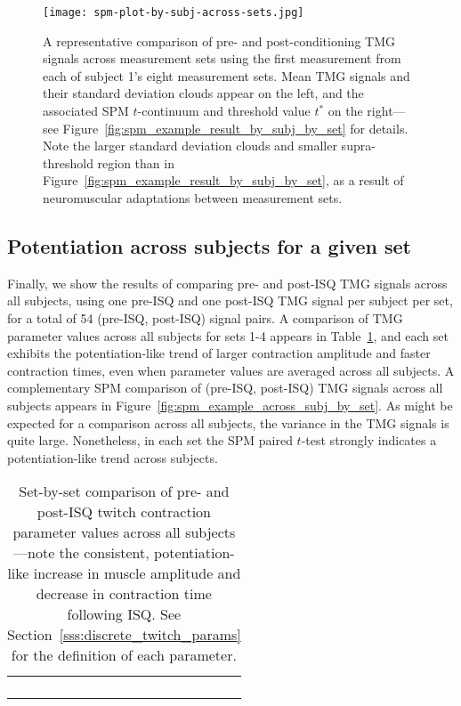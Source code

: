 \documentclass[utf8]{FrontiersinHarvard}
\begin{document}
\begin{figure}
	\centering
    \texttt{[image: spm-plot-by-subj-across-sets.jpg]}
    \caption{A representative comparison of pre- and post-conditioning TMG signals across measurement sets using the first measurement from each of subject 1's eight measurement sets.
    Mean TMG signals and their standard deviation clouds appear on the left, and the associated SPM $ t $-continuum and threshold value $ t^{*} $ on the right---see Figure~\ref{fig:spm_example_result_by_subj_by_set} for details.
    Note the larger standard deviation clouds and smaller supra-threshold region than in Figure~\ref{fig:spm_example_result_by_subj_by_set}, as a result of neuromuscular adaptations between measurement sets.}
    \label{fig:spm_example_result_by_subj_across_sets}
\end{figure}

\subsection{Potentiation across subjects for a given set}
Finally, we show the results of comparing pre- and post-ISQ TMG signals across all subjects, using one pre-ISQ and one post-ISQ TMG signal per subject per set, for a total of 54 (pre-ISQ, post-ISQ) signal pairs.
A comparison of TMG parameter values across all subjects for sets 1-4 appears in Table~\ref{tab:tmg_params_across_subj_by_set}, and each set exhibits the potentiation-like trend of larger contraction amplitude and faster contraction times, even when parameter values are averaged across all subjects.
A complementary SPM comparison of (pre-ISQ, post-ISQ) TMG signals across all subjects appears in Figure~\ref{fig:spm_example_across_subj_by_set}.
As might be expected for a comparison across all subjects, the variance in the TMG signals is quite large.
Nonetheless, in each set the SPM paired $ t $-test strongly indicates a potentiation-like trend across subjects.

\begin{table}
    \centering
    \caption{Set-by-set comparison of pre- and post-ISQ twitch contraction parameter values across all subjects---note the consistent, potentiation-like increase in muscle amplitude and decrease in contraction time following ISQ.
    See Section~\ref{sss:discrete_twitch_params} for the definition of each parameter.}
    \vspace{1ex}

    \renewcommand{\arraystretch}{1.2}
    \begin{tabular}{c}
         \hfill \\
         \hfill \\
         \hfill \\
         \hfill \\
    \end{tabular}

    \label{tab:tmg_params_across_subj_by_set}
\end{table}
\end{document}
